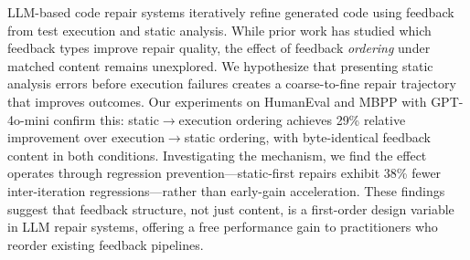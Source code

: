 LLM-based code repair systems iteratively refine generated code using feedback from test execution and static analysis. While prior work has studied which feedback types improve repair quality, the effect of feedback \emph{ordering} under matched content remains unexplored. We hypothesize that presenting static analysis errors before execution failures creates a coarse-to-fine repair trajectory that improves outcomes. Our experiments on HumanEval and MBPP with GPT-4o-mini confirm this: static$\rightarrow$execution ordering achieves 29\% relative improvement over execution$\rightarrow$static ordering, with byte-identical feedback content in both conditions. Investigating the mechanism, we find the effect operates through regression prevention---static-first repairs exhibit 38\% fewer inter-iteration regressions---rather than early-gain acceleration. These findings suggest that feedback structure, not just content, is a first-order design variable in LLM repair systems, offering a free performance gain to practitioners who reorder existing feedback pipelines.
